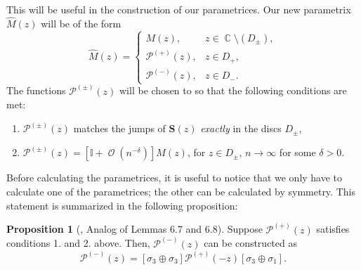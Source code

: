 \documentclass[usenames,dvipsnames]{article}
\theoremstyle{definition}
\newtheorem{prop}{Proposition}[section]
\DeclareMathOperator{\CC}{\mathbb{C}}
\DeclareMathOperator{\OO}{\mathcal{O}}
\numberwithin{equation}{section}
\numberwithin{figure}{section}
\begin{document}
This will be useful in the construction of our parametrices. Our new parametrix $\hat{M}(z)$ will be of the form
    \begin{equation}
        \hat{M}(z) = 
        \begin{cases}
            M(z), & z\in \CC \setminus (D_{\pm}),\\
            \mathcal{P}^{(+)}(z), & z\in D_+,\\
            \mathcal{P}^{(-)}(z), & z\in D_-.
        \end{cases}
    \end{equation}
The functions $\mathcal{P}^{(\pm)}(z)$ will be chosen to so that the following conditions are met:
    \begin{enumerate}
        \item $\mathcal{P}^{(\pm)}(z)$ matches the jumps of $\boldsymbol{S}(z)$ \textit{exactly} in the discs $D_{\pm}$,
        \item $\mathcal{P}^{(\pm)}(z) = [\mathbb{I} + \OO(n^{-\delta})] M(z)$, for $z\in D_{\pm}$, $n\to \infty$ for some $\delta >0$.
    \end{enumerate}
Before calculating the parametrices, it is useful to notice that we only have to calculate one of the parametrices; the other can be calculated by symmetry.
This statement is summarized in the following proposition:
\begin{prop}[\cite{DHL1}, Analog of Lemmas 6.7 and 6.8]\label{Parametrix-symmetry-prop}
    Suppose $\mathcal{P}^{(+)}(z)$ satisfies conditions 1. and 2. above. Then, $\mathcal{P}^{(-)}(z)$ can be constructed as
        \begin{equation}
            \mathcal{P}^{(-)}(z) = [\sigma_3\oplus \sigma_3]\mathcal{P}^{(+)}(-z)[\sigma_3 \oplus \sigma_1].
        \end{equation}
\end{prop}
\end{document}
